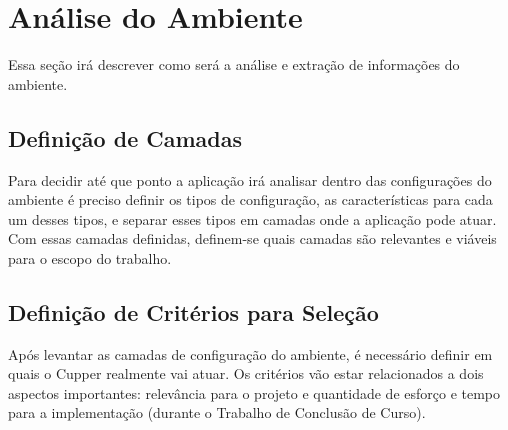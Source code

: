 \section{Análise do Ambiente}
Essa seção irá descrever como será a análise e extração de informações do ambiente. 


\subsection{Definição de Camadas}
Para decidir até que ponto a aplicação irá analisar dentro das configurações
do ambiente é preciso definir os tipos de configuração, as características para
cada um desses tipos, e separar esses tipos em camadas onde a aplicação pode atuar.
Com essas camadas definidas, definem-se quais camadas são relevantes e viáveis
para o escopo do trabalho.

\subsection{Definição de Critérios para Seleção}
\label{sec:defcritcamada}
Após levantar as camadas de configuração do ambiente, é necessário definir em
quais o Cupper realmente vai atuar. Os critérios vão estar relacionados a dois
aspectos importantes: relevância para o projeto e quantidade de esforço e tempo
para a implementação (durante o Trabalho de Conclusão de Curso). 


